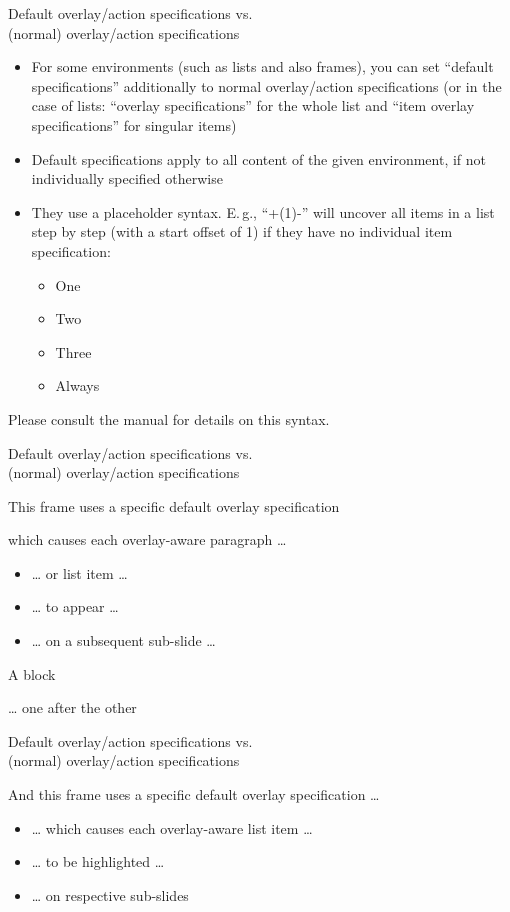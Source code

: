 \documentclass[english]{beamer}
\begin{document}
\begin{frame}{Default overlay/action specifications vs.\\
(normal) overlay/action specifications}
\begin{itemize}
\item For some environments (such as lists and also frames), you can set
``default specifications'' additionally to normal overlay/action
specifications (or in the case of lists: ``overlay specifications''
for the whole list and ``item overlay specifications'' for singular
items)
\item Default specifications apply to all content of the given environment,
if not individually specified otherwise
\item They use a placeholder syntax. E.\,g., ``+(1)-'' will uncover all
items in a list step by step (with a start offset of 1) if they have
no individual item specification:
\begin{itemize}[<+(1)->]
\item One
\item Two
\item Three
\item<1-> Always
\end{itemize}
\end{itemize}
Please consult the  manual for details on this
syntax.

\end{frame}
%
\begin{frame}[<+->]{Default overlay/action specifications vs.\\
(normal) overlay/action specifications}

\noindent This frame uses a specific default overlay specification

which causes each overlay-aware paragraph \ldots{}
\begin{itemize}
\item \ldots{} or list item \ldots{}
\item \ldots{} to appear \ldots{}
\item \ldots{} on a subsequent sub-slide \ldots{}
\end{itemize}
\begin{block}{A block}

\ldots{} one after the other
\end{block}
\end{frame}
%
\begin{frame}[<alert@+>]{Default overlay/action specifications vs.\\
(normal) overlay/action specifications}

\noindent And this frame uses a specific default overlay specification
\ldots{}
\begin{itemize}
\item \ldots{} which causes each overlay-aware list item \ldots{}
\item \ldots{} to be highlighted \ldots{}
\item \ldots{} on respective sub-slides
\end{itemize}
\end{frame}
\end{document}

